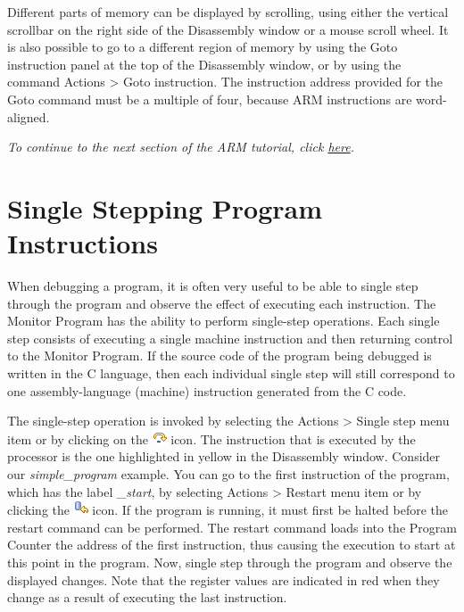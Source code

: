 \documentclass[11pt, twoside, pdftex]{article}
\begin{document}
Different parts of memory can be displayed by scrolling, 
using either the vertical scrollbar on the right side of the Disassembly window or a mouse scroll wheel.
It is also possible to go to a different region of memory by 
using the \textsf{Goto instruction} panel 
at the top of the Disassembly window, or by using the command \textsf{Actions > Goto instruction}.  The instruction address
provided for the {\sf Goto} command must be a multiple of four,
because ARM instructions are word-aligned. 

{\it To continue to the next section of the ARM tutorial, click \hyperref[tut:arm_3]{here}.}

\section{Single Stepping Program Instructions}

When debugging a program, it is often very useful to be able
to single step through the program and observe the effect of
executing each instruction. 
The Monitor Program has the ability to perform single-step
operations. Each single step consists of executing a single
machine instruction and then returning control to the Monitor
Program. If the source code of the program being debugged is
written in the C language, then each individual single step will
still correspond to one assembly-language (machine) instruction
generated from the C code. 

The single-step operation is invoked by selecting the
\textsf{Actions > Single step} menu item or by clicking on the \includegraphics{toolbar/singlestep.png} icon. The 
instruction that is executed by the processor is the
one highlighted in yellow in the \textsf{Disassembly} window.
Consider our {\it simple\_program} example. You can go to the
first instruction of the program, which has the label 
{\it \_start}, by selecting \textsf{Actions > Restart} 
menu item or by clicking  
the \includegraphics{toolbar/restart.png} icon. If the program is
running, it must first be halted before the restart 
command can be performed.
The restart command loads into the Program Counter the address of
the first instruction, thus causing the execution to start at
this point in the program.
Now, single step through the program and observe the displayed 
changes. Note that the register values are indicated in red when
they change as a result of executing the last instruction.
\end{document}
